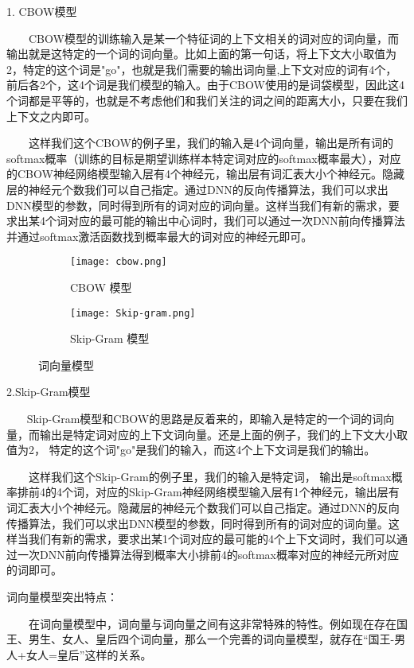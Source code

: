 1. CBOW模型

    CBOW模型的训练输入是某一个特征词的上下文相关的词对应的词向量，而输出就是这特定的一个词的词向量。比如上面的第一句话，将上下文大小取值为2，特定的这个词是"go"，也就是我们需要的输出词向量,上下文对应的词有4个，前后各2个，这4个词是我们模型的输入。由于CBOW使用的是词袋模型，因此这4个词都是平等的，也就是不考虑他们和我们关注的词之间的距离大小，只要在我们上下文之内即可。

    这样我们这个CBOW的例子里，我们的输入是4个词向量，输出是所有词的softmax概率（训练的目标是期望训练样本特定词对应的softmax概率最大），对应的CBOW神经网络模型输入层有4个神经元，输出层有词汇表大小个神经元。隐藏层的神经元个数我们可以自己指定。通过DNN的反向传播算法，我们可以求出DNN模型的参数，同时得到所有的词对应的词向量。这样当我们有新的需求，要求出某4个词对应的最可能的输出中心词时，我们可以通过一次DNN前向传播算法并通过softmax激活函数找到概率最大的词对应的神经元即可。


\begin{figure}[htbp]
	\centering
	\begin{subfigure}{.5\textwidth}
		\centering
		\texttt{[image: cbow.png]}
		\caption{CBOW 模型}
		\label{word_vec:cbow}
	\end{subfigure}%
	\begin{subfigure}{.5\textwidth}
		\centering
		\texttt{[image: Skip-gram.png]}
		\caption{Skip-Gram 模型}
		\label{word_vec:skip_gram}
	\end{subfigure}
	\caption{词向量模型}
	\label{word_vec:example}
\end{figure}

2.Skip-Gram模型

    Skip-Gram模型和CBOW的思路是反着来的，即输入是特定的一个词的词向量，而输出是特定词对应的上下文词向量。还是上面的例子，我们的上下文大小取值为2， 特定的这个词"go"是我们的输入，而这4个上下文词是我们的输出。

    这样我们这个Skip-Gram的例子里，我们的输入是特定词， 输出是softmax概率排前4的4个词，对应的Skip-Gram神经网络模型输入层有1个神经元，输出层有词汇表大小个神经元。隐藏层的神经元个数我们可以自己指定。通过DNN的反向传播算法，我们可以求出DNN模型的参数，同时得到所有的词对应的词向量。这样当我们有新的需求，要求出某1个词对应的最可能的4个上下文词时，我们可以通过一次DNN前向传播算法得到概率大小排前4的softmax概率对应的神经元所对应的词即可。

词向量模型突出特点：

    在词向量模型中，词向量与词向量之间有这非常特殊的特性。例如现在存在国王、男生、女人、皇后四个词向量，那么一个完善的词向量模型，就存在“国王-男人+女人=皇后”这样的关系。
